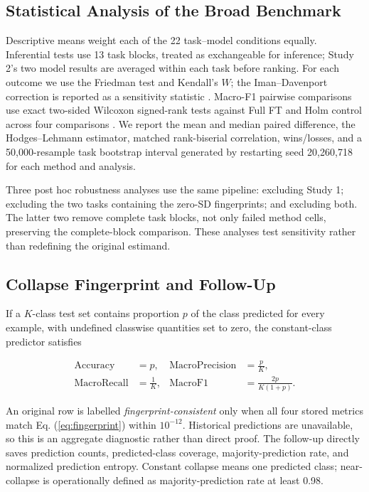 \documentclass{SPC}
\begin{document}
\subsection{Statistical Analysis of the Broad Benchmark}

Descriptive means weight each of the 22 task--model conditions equally. Inferential tests use 13 task blocks, treated as exchangeable for inference; Study 2's two model results are averaged within each task before ranking. For each outcome we use the Friedman test and Kendall's $W$; the Iman--Davenport correction is reported as a sensitivity statistic \cite{24}. Macro-F1 pairwise comparisons use exact two-sided Wilcoxon signed-rank tests against Full FT and Holm control across four comparisons \cite{25}. We report the mean and median paired difference, the Hodges--Lehmann estimator, matched rank-biserial correlation, wins/losses, and a 50,000-resample task bootstrap interval generated by restarting seed 20,260,718 for each method and analysis.

Three post hoc robustness analyses use the same pipeline: excluding Study 1; excluding the two tasks containing the zero-SD fingerprints; and excluding both. The latter two remove complete task blocks, not only failed method cells, preserving the complete-block comparison. These analyses test sensitivity rather than redefining the original estimand.

\subsection{Collapse Fingerprint and Follow-Up}

If a $K$-class test set contains proportion $p$ of the class predicted for every example, with undefined classwise quantities set to zero, the constant-class predictor satisfies

\begin{align}
\mathrm{Accuracy} &= p, &
\mathrm{MacroPrecision} &= \frac{p}{K}, \\
\mathrm{MacroRecall} &= \frac{1}{K}, &
\mathrm{MacroF1} &= \frac{2p}{K(1+p)}.
\label{eq:fingerprint}
\end{align}

An original row is labelled \emph{fingerprint-consistent} only when all four stored metrics match Eq. (\ref{eq:fingerprint}) within $10^{-12}$. Historical predictions are unavailable, so this is an aggregate diagnostic rather than direct proof. The follow-up directly saves prediction counts, predicted-class coverage, majority-prediction rate, and normalized prediction entropy. Constant collapse means one predicted class; near-collapse is operationally defined as majority-prediction rate at least 0.98.
\end{document}
